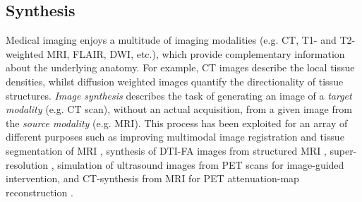 
\vspace{-2mm}
\subsection*{Synthesis}
Medical imaging enjoys a multitude of imaging modalities (e.g. CT, T1- and T2-weighted MRI, FLAIR, DWI, etc.), which provide complementary information about the underlying anatomy. For example, CT images describe the local tissue densities, whilst diffusion weighted images quantify the directionality of tissue structures. \textit{Image synthesis} describes the task of generating an image of a\textit{ target modality} (e.g. CT scan), without an actual acquisition, from a given image from the \textit{source modality} (e.g. MRI). This process has been exploited for an array of different purposes such as improving multimodal image registration and tissue segmentation of MRI \cite{iglesias2013synthesizing}, synthesis of DTI-FA images from structured MRI \cite{ye2013modality}, super-resolution \cite{rousseau2008brain,zhang2012hierarchical}, simulation of ultrasound images from PET scans \cite{wein2008automatic} for image-guided intervention, and CT-synthesis from MRI for PET attenuation-map reconstruction \cite{burgos2014attenuation}. 

